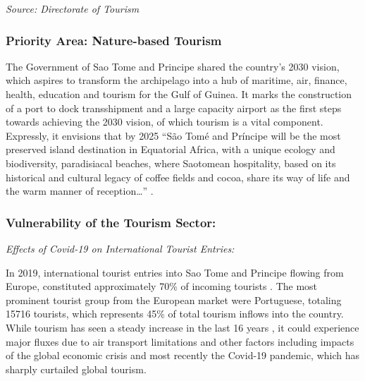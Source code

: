 \documentclass[
]{book}
\begin{document}
\emph{Source: Directorate of Tourism }

\hypertarget{priority-area-nature-based-tourism}{%
\subsubsection{Priority Area: Nature-based Tourism}\label{priority-area-nature-based-tourism}}

The Government of Sao Tome and Principe shared the country's 2030 vision, which aspires to transform the archipelago into a hub of maritime, air, finance, health, education and tourism for the Gulf of Guinea. It marks the construction of a port to dock transshipment and a large capacity airport as the first steps towards achieving the 2030 vision, of which tourism is a vital component. Expressly, it envisions that by 2025 ``São Tomé and Príncipe will be the most preserved island destination in Equatorial Africa, with a unique ecology and biodiversity, paradisiacal beaches, where Saotomean hospitality, based on its historical and cultural legacy of coffee fields and cocoa, share its way of life and the warm manner of reception\ldots{}'' .

\hypertarget{vulnerability-of-the-tourism-sector}{%
\subsubsection{\texorpdfstring{\textbf{Vulnerability of the Tourism Sector:}}{Vulnerability of the Tourism Sector:}}\label{vulnerability-of-the-tourism-sector}}

\emph{Effects of Covid-19 on International Tourist Entries:}

In 2019, international tourist entries into Sao Tome and Principe flowing from Europe, constituted approximately 70\% of incoming tourists . The most prominent tourist group from the European market were Portuguese, totaling 15716 tourists, which represents 45\% of total tourism inflows into the country. While tourism has seen a steady increase in the last 16 years , it could experience major fluxes due to air transport limitations and other factors including impacts of the global economic crisis and most recently the Covid-19 pandemic, which has sharply curtailed global tourism.
\end{document}
